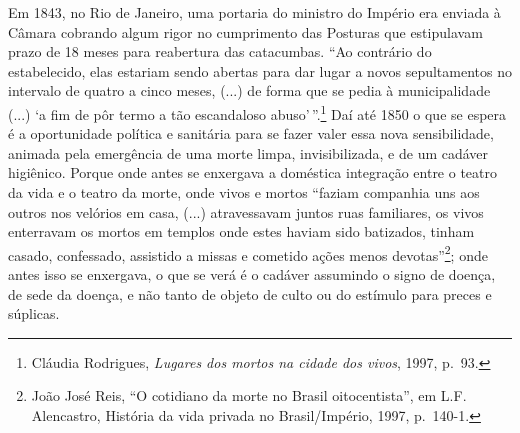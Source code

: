 Em 1843, no Rio de Janeiro, uma portaria do ministro do Império era
enviada à Câmara cobrando algum rigor no cumprimento das Posturas que
estipulavam prazo de 18 meses para reabertura das catacumbas. ``Ao
contrário do estabelecido, elas estariam sendo abertas para dar lugar a
novos sepultamentos no intervalo de quatro a cinco meses, (...) de forma
que se pedia à municipalidade (...) `a fim de pôr termo a tão
escandaloso abuso'\,''.\footnote{Cláudia Rodrigues, \emph{Lugares dos
  mortos na cidade dos vivos}, 1997, p.~93.} Daí até 1850 o que se
espera é a oportunidade política e sanitária para se fazer valer essa
nova sensibilidade, animada pela emergência de uma morte limpa,
invisibilizada, e de um cadáver higiênico. Porque onde antes se
enxergava a doméstica integração entre o teatro da vida e o teatro da
morte, onde vivos e mortos ``faziam companhia uns aos outros nos
velórios em casa, (...) atravessavam juntos ruas familiares, os vivos
enterravam os mortos em templos onde estes haviam sido batizados, tinham
casado, confessado, assistido a missas e cometido ações menos
devotas''\footnote{João José Reis, ``O cotidiano da morte no Brasil
  oitocentista'', em L.F. Alencastro, História da vida privada no
  Brasil/Império, 1997, p.~140-1.}; onde antes isso se enxergava, o que
se verá é o cadáver assumindo o signo de doença, de sede da doença, e
não tanto de objeto de culto ou do estímulo para preces e súplicas.

